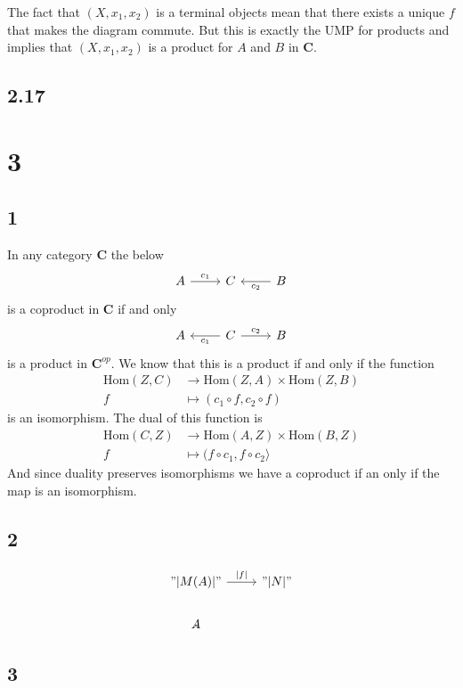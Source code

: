 \documentclass{book}
\theoremstyle{definition}
\newcommand\Hom{\text{Hom}}
\begin{document}
The fact that $(X, x_1, x_2)$ is a terminal objects mean that there exists a
unique $f$ that makes the diagram commute. But this is exactly the UMP for
products and implies that $(X, x_1, x_2)$ is a product for $A$ and $B$ in
$\mathbf{C}$.

\subsection{2.17}

\section{3}

\subsection{1}

In any category $\mathbf{C}$ the below
\[
  \begin{tikzcd}
    A \ar[r, "c_1"] & C & B \ar[l, "c_2"]
  \end{tikzcd}
\]
is a coproduct in $\mathbf{C}$ if and only
\[
  \begin{tikzcd}
    A & C \ar[l, "c_1"] \ar[r, "c_2"] & B
  \end{tikzcd}
\]
is a product in $\mathbf{C}^{op}$. We know that this is a product if and only if
the function
\begin{align*}
  \Hom(Z, C) & \to \Hom(Z, A) \times \Hom(Z, B) \\
  f & \mapsto ( c_1 \circ f, c_2 \circ f )
\end{align*}
is an isomorphism. The dual of this function is
\begin{align*}
  \Hom(C, Z) & \to \Hom(A, Z) \times \Hom(B, Z) \\
  f & \mapsto (f \circ c_1, f \circ c_2 \rangle
\end{align*}
And since duality preserves isomorphisms we have a coproduct if an only if the
map is an isomorphism.

\subsection{2}

\[
  \begin{tikzcd}
    "|M(A)|" \ar[r, "|f|"] & "|N|" \\
    A \ar[]
  \end{tikzcd}
\]

\subsection{3}
\end{document}
